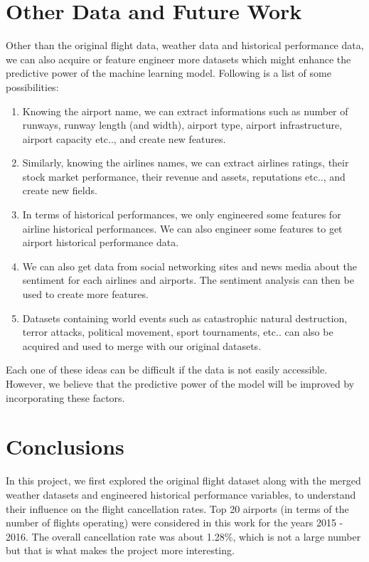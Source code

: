 \documentclass[12pt]{article}
\begin{document}
\section{Other Data and Future Work}
\label{sec:otherdata}
Other than the original flight data, weather data and historical performance data, we can also acquire or feature engineer more datasets which might enhance the predictive power of the machine learning model. Following is a list of some possibilities:
\begin{enumerate}
\item Knowing the airport name, we can extract informations such as number of runways, runway length (and width), airport type, airport infrastructure, airport capacity etc.., and create new features. 
\item Similarly, knowing the airlines names, we can extract airlines ratings, their stock market performance, their revenue and assets, reputations etc.., and create new fields. 
\item In terms of historical performances, we only engineered some features for airline historical performances. We can also engineer some features to get airport historical performance data. 
\item We can also get data from social networking sites and news media about the sentiment for each airlines and airports. The sentiment analysis can then be used to create more features. 
\item Datasets containing world events such as catastrophic natural destruction, terror attacks, political movement, sport tournaments, etc.. can also be acquired and used to merge with our original datasets. 
\end{enumerate}
Each one of these ideas can be difficult if the data is not easily accessible. However, we believe that the predictive power of the model will be improved by incorporating these factors.  
\section{Conclusions}
In this project, we first explored the original flight dataset along with the merged weather datasets and engineered historical performance variables, to understand their influence on the flight cancellation rates. Top 20 airports (in terms of the number of flights operating) were considered in this work for the years 2015 - 2016. The overall cancellation rate was about 1.28$\%$, which is not a large number but that is what makes the project more interesting. 
\end{document}
